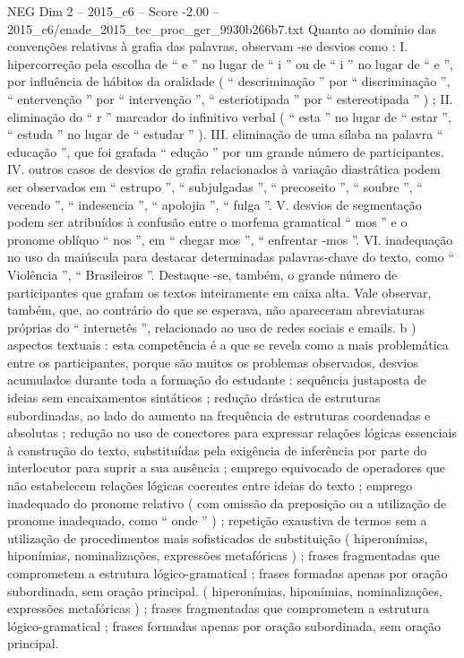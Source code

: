\begin{textsample}{NEG Dim 2 – 2015\_c6 – Score -2.00 – 2015\_c6/enade\_2015\_tec\_proc\_ger\_9930b266b7.txt}
Quanto ao domínio das convenções relativas à grafia das palavras, observam -se desvios como : I. hipercorreção pela escolha de “ e ” no lugar de “ i ” ou de “ i ” no lugar de “ e ”, por influência de hábitos da oralidade ( “ descriminação ” por “ discriminação ”, “ entervenção ” por “ intervenção ”, “ esteriotipada ” por “ estereotipada ” ) ; II. eliminação do “ r ” marcador do infinitivo verbal ( “ esta ” no lugar de “ estar ”, “ estuda ” no lugar de “ estudar ” ).
III. eliminação de uma sílaba na palavra “ educação ”, que foi grafada “ edução ” por um grande número de participantes.
IV. outros casos de desvios de grafia relacionados à variação diastrática podem ser observados em “ estrupo ”, “ subjulgadas ”, “ precoseito ”, “ soubre ”, “ vecendo ”, “ indesencia ”, “ apolojia ”, “ fulga ”.
V. desvios de segmentação podem ser atribuídos à confusão entre o morfema gramatical “ mos ” e o pronome oblíquo “ nos ”, em “ chegar mos ”, “ enfrentar -mos ”.
VI. inadequação no uso da maiúscula para destacar determinadas palavras-chave do texto, como “ Violência ”, “ Brasileiros ”.
Destaque -se, também, o grande número de participantes que grafam os textos inteiramente em caixa alta.
Vale observar, também, que, ao contrário do que se esperava, não apareceram abreviaturas próprias do “ internetês ”, relacionado ao uso de redes sociais e emails. b ) aspectos textuais : esta competência é a que se revela como a mais problemática entre os participantes, porque são muitos os problemas observados, desvios acumulados durante toda a formação do estudante : sequência justaposta de ideias sem encaixamentos sintáticos ; redução drástica de estruturas subordinadas, ao lado do aumento na frequência de estruturas coordenadas e absolutas ; redução no uso de conectores para expressar relações lógicas essenciais à construção do texto, substituídas pela exigência de inferência por parte do interlocutor para suprir a sua ausência ; emprego equivocado de operadores que não estabelecem relações lógicas coerentes entre ideias do texto ; emprego inadequado do pronome relativo ( com omissão da preposição ou a utilização de pronome inadequado, como “ onde ” ) ; repetição exaustiva de termos sem a utilização de procedimentos mais sofisticados de substituição ( hiperonímias, hiponímias, nominalizações, expressões metafóricas ) ; frases fragmentadas que comprometem a estrutura lógico-gramatical ; frases formadas apenas por oração subordinada, sem oração principal. ( hiperonímias, hiponímias, nominalizações, expressões metafóricas ) ; frases fragmentadas que comprometem a estrutura lógico-gramatical ; frases formadas apenas por oração subordinada, sem oração principal.

\end{textsample}
